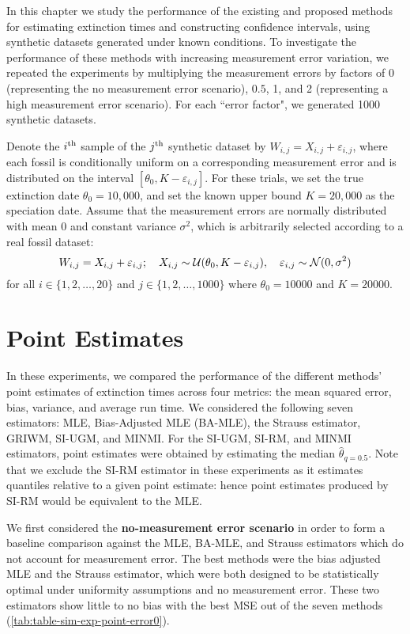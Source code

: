 
In this chapter we study the performance of the existing and proposed methods for estimating extinction times and constructing confidence intervals, using synthetic datasets generated under known conditions. To investigate the performance of these methods with increasing measurement error variation, we repeated the experiments by multiplying the measurement errors by factors of 0 (representing the no measurement error scenario), $0.5$, 1, and 2 (representing a high measurement error scenario). For each ``error factor", we generated 1000 synthetic datasets.

Denote the $i\textsuperscript{th}$ sample of the $j\textsuperscript{th}$ synthetic dataset by $W_{i, j} = X_{i, j} + \varepsilon_{i, j}$, where each fossil is conditionally uniform on a corresponding measurement error and is distributed on the interval $\left[ \theta_0, K - \varepsilon_{i,j} \right]$. For these trials, we set the true extinction date $\theta_0 = 10,000$, and set the known upper bound $K = 20,000$ as the speciation date. Assume that the measurement errors are normally distributed with mean 0 and constant variance $\sigma^2$, which is arbitrarily selected according to a real fossil dataset: \[
W_{i, j} = X_{i, j} + \varepsilon_{i, j}; \quad X_{i, j} \sim \mathcal{U}(\theta_0, K - \varepsilon_{i, j}), \quad \varepsilon_{i, j} \sim \mathcal{N}(0, \sigma^2)
\] for all $i \in \{1, 2, \dots, 20\}$ and $j \in \{1, 2, \dots, 1000\}$ where $\theta_0 = 10000$ and $K = 20000$.

\section{Point Estimates}

In these experiments, we compared the performance of the different methods' point estimates of extinction times across four metrics: the mean squared error, bias, variance, and average run time. We considered the following seven estimators: MLE, Bias-Adjusted MLE (BA-MLE), the Strauss estimator, GRIWM, SI-UGM, and MINMI. For the SI-UGM, SI-RM, and MINMI estimators, point estimates were obtained by estimating the median $\hat\theta_{q=0.5}$. Note that we exclude the SI-RM estimator in these experiments as it estimates quantiles relative to a given point estimate: hence point estimates produced by SI-RM would be equivalent to the MLE.

We first considered the \textbf{no-measurement error scenario }in order to form a baseline comparison against the MLE, BA-MLE, and Strauss estimators which do not account for measurement error. The best methods were the bias adjusted MLE and the Strauss estimator, which were both designed to be statistically optimal under uniformity assumptions and no measurement error. These two estimators show little to no bias with the best MSE out of the seven methods (\autoref{tab:table-sim-exp-point-error0}).
 
